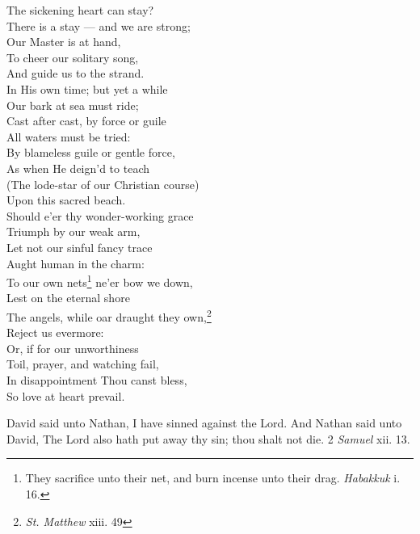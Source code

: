  The sickening heart can stay? \\
  There is a stay — and we are strong; \\
 Our Master is at hand, \\
 To cheer our solitary song, \\
 And guide us to the strand. \\
  In His own time; but yet a while \\
 Our bark at sea must ride; \\
 Cast after cast, by force or guile \\
 All waters must be tried: \\
  By blameless guile or gentle force, \\
 As when He deign’d to teach \\
 (The lode-star of our Christian course) \\
 Upon this sacred beach. \\
  Should e’er thy wonder-working grace \\
 Triumph by our weak arm, \\
 Let not our sinful fancy trace \\
 Aught human in the charm: \\
  To our own nets\footnote{They sacrifice unto their net, and burn incense unto their drag. \emph{Habakkuk} i. 16.} ne’er bow we down, \\
 Lest on the eternal shore \\
 The angels, while oar draught they own,\footnote{\emph{St. Matthew} xiii. 49} \\
 Reject us evermore: \\
  Or, if for our unworthiness \\
 Toil, prayer, and watching fail, \\
 In disappointment Thou canst bless, \\
 So love at heart prevail.\\


David said unto Nathan, I have sinned against the Lord. And Nathan said unto David, The Lord also hath put away thy sin; thou shalt not die. 2 \emph{Samuel} xii. 13.

